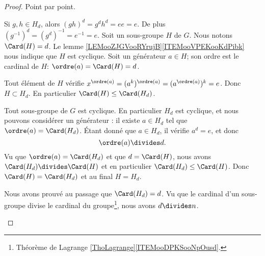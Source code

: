 \begin{proof}
    Point par point.
    \begin{subproof}
                \label{ITEMooYAMOooVtbCrS}
        Si \( g,h\in H_d\), alors \( (gh)^d=g^dh^d=ee=e\). De plus \( (g^{-1})^d=(g^d)^{-1}=e^{-1}=e\).
           \label{ITEMooXEXFooIrFOTi}
        Soit un sous-groupe \( H\) de \( G\). Nous notons \( \Card(H)=d\). Le lemme \ref{LEMooZJGVooRYrujB}\ref{ITEMooVPEKooKdPibk} nous indique que \( H\) est cyclique. Soit un générateur \(a\in H\); son ordre est le cardinal de \( H\): \( \ordre(a)=\Card(H)=d\). 

        Tout élément de \( H\) vérifie \( x^{\ordre(a)}=(a^k)^{\ordre(a)}=(a^{\ordre(a)})^k=e\). Donc \( H\subset H_d\). En particulier \( \Card(H)\leq \Card(H_d)\).

        Tout sous-groupe de \( G\) est cyclique. En particulier \( H_d\) est cyclique, et nous pouvons considérer un générateur : il existe \( a\in H_d\) tel que \( \ordre(a)=\Card(H_d)\). Étant donné que \( a\in H_d\), il vérifie \( a^d=e\), et donc 
        \begin{equation}
            \ordre(a)\divides d.
        \end{equation}
        Vu que \( \ordre(a)=\Card(H_d)\) et que \( d=\Card(H)\), nous avons \( \Card(H_d)\divides \Card(H)\) et en particulier \( \Card(H_d)\leq \Card(H)\). Donc \( \Card(H)=\Card(H_d)\) et au final \( H=H_d\).

        Nous avons prouvé au passage que \( \Card(H_d)=d\). Vu que le cardinal d'un sous-groupe divise le cardinal du groupe\footnote{Théorème de Lagrange \ref{ThoLagrange}\ref{ITEMooDPKSooNpOusd}.}, nous avons \( d\divides n\).
        

\end{subproof}
\end{proof}
